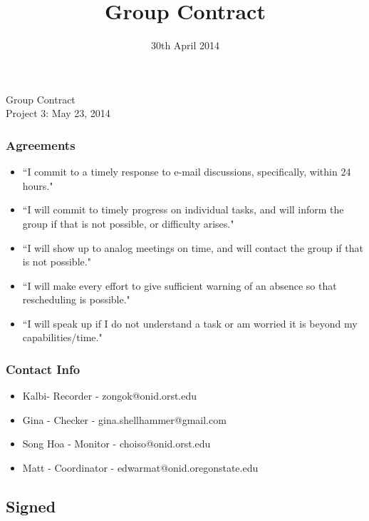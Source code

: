 \documentclass{article}
\title{Group Contract}
\date{30th April 2014}
\begin{document}


\begingroup
  \centering
  \LARGE Group Contract\\[1em]
  \large Project 3: May 23, 2014\par
\endgroup

\subsubsection*{Agreements}

\begin{itemize}
\item ``I commit to a timely response to e-mail discussions, specifically, within 24 hours."

\item``I will commit to timely progress on individual tasks, and will inform the group if that is not possible, or difficulty arises."

\item``I will show up to analog meetings on time, and will contact the group if that is not possible."

\item``I will make every effort to give sufficient warning of an absence so that rescheduling is possible."

\item``I will speak up if I do not understand a task or am worried it is beyond my capabilities/time."
\end{itemize}

\subsubsection*{Contact Info}

\begin{itemize}
\item[] Kalbi- Recorder -  zongok@onid.orst.edu 
\item[] Gina - Checker - gina.shellhammer@gmail.com 
\item[] Song Hoa - Monitor - choiso@onid.orst.edu 
\item[] Matt - Coordinator - edwarmat@onid.oregonstate.edu 
\end{itemize}

\subsection*{Signed}
\end{document}

